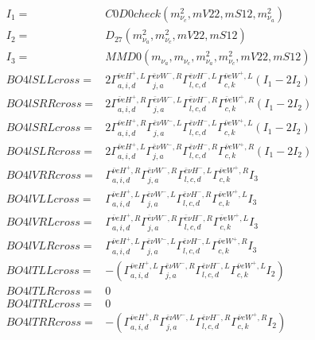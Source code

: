 \documentclass[A4,landscape]{article}
\begin{document}
\begin{align} 
I_1 = & C0D0check(m^2_{\nu_{{c}}}, mV22, mS12, m^2_{\nu_{{a}}}) \\ 
I_2 = & D_{27}(m^2_{\nu_{{a}}}, m^2_{\nu_{{c}}}, mV22, mS12) \\ 
I_3 = & MMD0(m_{\nu_{{a}}}, m_{\nu_{{c}}}, m^2_{\nu_{{a}}}, m^2_{\nu_{{c}}}, mV22, mS12) \\ 
  BO4lSLLcross= & 2  \Gamma^{\bar{\nu}e H^+,L}_{a, i, d} \Gamma^{\bar{e}\nu W^- ,R}_{j, a} \Gamma^{\bar{e}\nu H^- ,L}_{l, c, d} \Gamma^{\bar{\nu}e W^+,L}_{c, k} (I_1 - 2 I_2) \\ 
  BO4lSRRcross= & 2  \Gamma^{\bar{\nu}e H^+,R}_{a, i, d} \Gamma^{\bar{e}\nu W^- ,L}_{j, a} \Gamma^{\bar{e}\nu H^- ,R}_{l, c, d} \Gamma^{\bar{\nu}e W^+,R}_{c, k} (I_1 - 2 I_2) \\ 
  BO4lSRLcross= & 2  \Gamma^{\bar{\nu}e H^+,R}_{a, i, d} \Gamma^{\bar{e}\nu W^- ,L}_{j, a} \Gamma^{\bar{e}\nu H^- ,L}_{l, c, d} \Gamma^{\bar{\nu}e W^+,L}_{c, k} (I_1 - 2 I_2) \\ 
  BO4lSLRcross= & 2  \Gamma^{\bar{\nu}e H^+,L}_{a, i, d} \Gamma^{\bar{e}\nu W^- ,R}_{j, a} \Gamma^{\bar{e}\nu H^- ,R}_{l, c, d} \Gamma^{\bar{\nu}e W^+,R}_{c, k} (I_1 - 2 I_2) \\ 
  BO4lVRRcross= &  \Gamma^{\bar{\nu}e H^+,R}_{a, i, d} \Gamma^{\bar{e}\nu W^- ,R}_{j, a} \Gamma^{\bar{e}\nu H^- ,L}_{l, c, d} \Gamma^{\bar{\nu}e W^+,R}_{c, k} I_3 \\ 
  BO4lVLLcross= &  \Gamma^{\bar{\nu}e H^+,L}_{a, i, d} \Gamma^{\bar{e}\nu W^- ,L}_{j, a} \Gamma^{\bar{e}\nu H^- ,R}_{l, c, d} \Gamma^{\bar{\nu}e W^+,L}_{c, k} I_3 \\ 
  BO4lVRLcross= &  \Gamma^{\bar{\nu}e H^+,R}_{a, i, d} \Gamma^{\bar{e}\nu W^- ,R}_{j, a} \Gamma^{\bar{e}\nu H^- ,R}_{l, c, d} \Gamma^{\bar{\nu}e W^+,L}_{c, k} I_3 \\ 
  BO4lVLRcross= &  \Gamma^{\bar{\nu}e H^+,L}_{a, i, d} \Gamma^{\bar{e}\nu W^- ,L}_{j, a} \Gamma^{\bar{e}\nu H^- ,L}_{l, c, d} \Gamma^{\bar{\nu}e W^+,R}_{c, k} I_3 \\ 
  BO4lTLLcross= & -( \Gamma^{\bar{\nu}e H^+,L}_{a, i, d} \Gamma^{\bar{e}\nu W^- ,R}_{j, a} \Gamma^{\bar{e}\nu H^- ,L}_{l, c, d} \Gamma^{\bar{\nu}e W^+,L}_{c, k} I_2) \\ 
  BO4lTLRcross= & 0 \\ 
  BO4lTRLcross= & 0 \\ 
  BO4lTRRcross= & -( \Gamma^{\bar{\nu}e H^+,R}_{a, i, d} \Gamma^{\bar{e}\nu W^- ,L}_{j, a} \Gamma^{\bar{e}\nu H^- ,R}_{l, c, d} \Gamma^{\bar{\nu}e W^+,R}_{c, k} I_2) \\ 
\end{align} 
\end{document}
